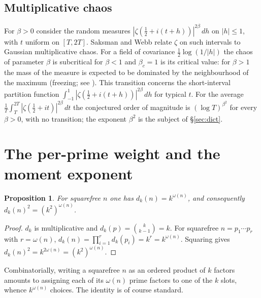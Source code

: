 \documentclass[11pt]{amsart}
\newtheorem{proposition}[theorem]{Proposition}
\theoremstyle{definition}
\newcommand{\half}{\tfrac12}
\newcommand{\dk}{d_k}
\begin{document}
\subsection{Multiplicative chaos}
For $\beta>0$ consider the random measures $|\zeta(\half+i(t+h))|^{2\beta}\,dh$ on $|h|\le1$, with $t$ uniform
on $[T,2T]$. Saksman and Webb \cite{SaksmanWebb} relate $\zeta$ on such intervals to Gaussian multiplicative
chaos. For a field of covariance $\half\log(1/|h|)$ the chaos of parameter $\beta$ is subcritical for $\beta<1$
and $\beta_c=1$ is its critical value: for $\beta>1$ the mass of the measure is expected to be dominated by the
neighbourhood of the maximum (freezing; see \cite{FHK,FK,HarperFHK}). This transition concerns the short-interval
partition function $\int_{-1}^{1}|\zeta(\half+i(t+h))|^{2\beta}\,dh$ for typical $t$. For the average
$\frac1T\int_T^{2T}|\zeta(\half+it)|^{2\beta}\,dt$ the conjectured order of magnitude is $(\log T)^{\beta^2}$ for
every $\beta>0$, with no transition; the exponent $\beta^2$ is the subject of \S\ref{sec:dict}.

\section{The per-prime weight and the moment exponent}\label{sec:weight}

\begin{proposition}\label{prop:dk}
For squarefree $n$ one has $\dk(n)=k^{\omega(n)}$, and consequently $\dk(n)^2=(k^2)^{\omega(n)}$.
\end{proposition}
\begin{proof}
$\dk$ is multiplicative and $\dk(p)=\binom{k}{k-1}=k$. For squarefree $n=p_1\cdots p_r$ with $r=\omega(n)$,
$\dk(n)=\prod_{i=1}^r\dk(p_i)=k^r=k^{\omega(n)}$. Squaring gives $\dk(n)^2=k^{2\omega(n)}=(k^2)^{\omega(n)}$.
\end{proof}

Combinatorially, writing a squarefree $n$ as an ordered product of $k$ factors amounts to assigning each of its
$\omega(n)$ prime factors to one of the $k$ slots, whence $k^{\omega(n)}$ choices. The identity is of course
standard.
\end{document}
